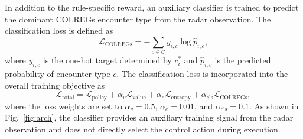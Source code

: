 \documentclass[final,5p,times,twocolumn]{elsarticle}
\begin{document}
{In addition to the rule-specific reward, an auxiliary classifier is
trained to predict the dominant COLREGs encounter type from the radar
observation. The classification loss is defined as
\begin{equation}
\mathcal{L}_{\mathrm{COLREGs}}
=
-\sum_{c\in\mathcal{C}}
y_{i,c}\log \hat{p}_{i,c},
\label{eq:colregs_loss}
\end{equation}
where $y_{i,c}$ is the one-hot target determined by $c_i^*$ and $\hat{p}_{i,c}$ is the predicted probability of encounter type $c$. The classification loss is incorporated into the overall training objective as
\begin{equation}
\mathcal{L}_{\mathrm{total}}
=\mathcal{L}_{\mathrm{policy}}+\alpha_v\mathcal{L}_{\mathrm{value}}+\alpha_e\mathcal{L}_{\mathrm{entropy}}+
\alpha_{\mathrm{cls}}\mathcal{L}_{\mathrm{COLREGs}},
\end{equation}
where the loss weights are set to $\alpha_v=0.5$, $\alpha_e=0.01$, and $\alpha_{\mathrm{cls}}=0.1$. As shown in Fig.~\ref{fig:arch}, the classifier provides an auxiliary training signal from the radar observation and does not directly select the control action during execution.
}




\end{document}
